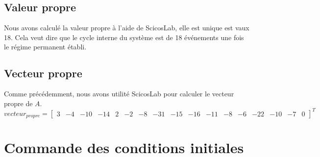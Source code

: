 \subsection{Valeur propre}
Nous avons calculé la valeur propre à l'aide de ScicosLab, elle est unique est vaux 18. Cela veut dire que le cycle interne du système est de 18 événements une fois le régime permanent établi.
\subsection{Vecteur propre}
Comme précédemment, nous avons utilité ScicosLab pour calculer le vecteur propre de $A$.
\begin{equation}
vecteur_{propre} = 
\left[
\begin{array}{ccccccccccccccccc}
3 & -4 & -10 & -14 & 2 & -2 & -8 & -31& -15 & -16 & -11 & -8 & -6 & -22 & -10 & -7 & 0
\end{array} \right]^T
\end{equation}
\section{Commande des conditions initiales}



